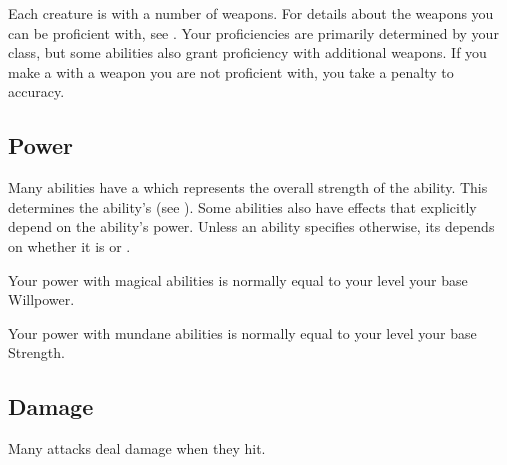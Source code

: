          Each creature is  with a number of weapons.
        For details about the weapons you can be proficient with, see .
        Your proficiencies are primarily determined by your class, but some abilities also grant proficiency with additional weapons.
        If you make a  with a weapon you are not proficient with, you take a  penalty to accuracy.

    \subsection{Power}\label{Power}
        Many abilities have a  which represents the overall strength of the ability.
        This determines the ability's  (see ).
        Some abilities also have effects that explicitly depend on the ability's power.
        Unless an ability specifies otherwise, its  depends on whether it is  or .

        Your power with magical abilities is normally equal to your level \add your base Willpower.

        Your power with mundane abilities is normally equal to your level \add your base Strength.

    \subsection{Damage}\label{Damage}
        Many attacks deal damage when they hit.
